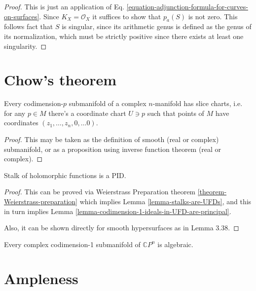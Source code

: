 \begin{proof}
This is just an application of Eq.
\ref{equation-adjunction-formula-for-curves-on-surfaces}. Since
$K_X=\mathcal{O}_X$ it suffices to show that $p_a(S)$ is not zero. This follows
fact that $S$ is singular, since its arithmetic genus is defined as the genus of
its normalization, which must be strictly positive since there exists at least
one singularity.
\end{proof}

\section{Chow's theorem}
\label{section-chow-theorem}

\begin{proposition}
\label{proposition-slice-charts}
Every codimension-$p$ submanifold of a complex $n$-manifold has slice charts,
i.e. for any $p \in M$ there's a coordinate chart $U \ni p$ such that points of
$M$ have coordinates $(z_1,\ldots,z_n,0,\ldots 0)$.
\end{proposition}

\begin{proof}
This may be taken as the definition of smooth (real or complex) submanifold, or
as a proposition using inverse function theorem (real or complex).
\end{proof}

\begin{proposition}
\label{proposition-stalk-is-PID}
Stalk of holomorphic functions is a PID.
\end{proposition}

\begin{proof}
This can be proved via Weierstrass Preparation theorem
\ref{theorem-Weierstrass-preparation} which implies
 Lemma \ref{lemma-stalks-are-UFDs}, and this in turn implies Lemma 
\ref{lemma-codimension-1-ideals-in-UFD-are-principal}.

Also, it can be shown directly for smooth hypersurfaces
 as in \cite{lec} Lemma 3.38.
\end{proof}

\begin{theorem}
\label{theorem-Chow-for-hypersurfaces}
Every complex codimension-1 submanifold of $\mathbb{C}P^{n}$ is algebraic.
\end{theorem}

\section{Ampleness}
\label{section-ampleness}

